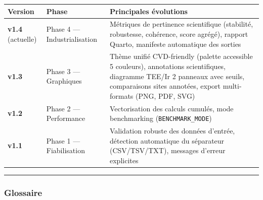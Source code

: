 {\def\LTcaptype{none} %
\begin{longtable}[]{@{}
  >{\raggedright\arraybackslash}p{}
  >{\raggedright\arraybackslash}p{}
  >{\raggedright\arraybackslash}p{}@{}}
\toprule\noalign{}
\begin{minipage}[b]{\linewidth}\raggedright
Version
\end{minipage} & \begin{minipage}[b]{\linewidth}\raggedright
Phase
\end{minipage} & \begin{minipage}[b]{\linewidth}\raggedright
Principales évolutions
\end{minipage} \\
\midrule\noalign{}
\endhead
\bottomrule\noalign{}
\endlastfoot
\textbf{v1.4} (actuelle) & Phase 4 --- Industrialisation & Métriques de
pertinence scientifique (stabilité, robustesse, cohérence, score
agrégé), rapport Quarto, manifeste automatique des sorties \\
\textbf{v1.3} & Phase 3 --- Graphiques & Thème unifié CVD-friendly
(palette accessible 5 couleurs), annotations scientifiques, diagramme
TEE/Ir 2 panneaux avec seuils, comparaisons sites annotées, export
multi-formats (PNG, PDF, SVG) \\
\textbf{v1.2} & Phase 2 --- Performance & Vectorisation des calculs
cumulés, mode benchmarking (\texttt{BENCHMARK\_MODE}) \\
\textbf{v1.1} & Phase 1 --- Fiabilisation & Validation robuste des
données d'entrée, détection automatique du séparateur (CSV/TSV/TXT),
messages d'erreur explicites \\
\end{longtable}
}

\begin{center}\rule{0.5\linewidth}{0.5pt}\end{center}

\subsubsection{Glossaire}\label{glossaire}

